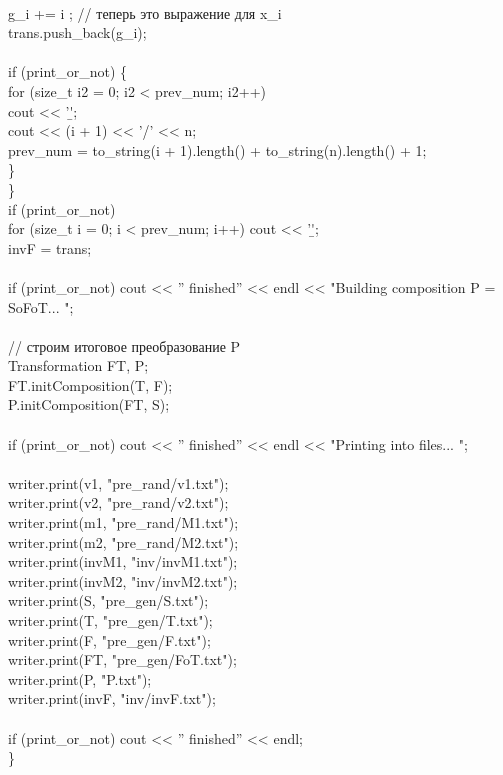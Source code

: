 		\\
		g\_i += { i }; // теперь это выражение для x\_i\\
		trans.push\_back(g\_i);\\
		\\
		if (print\_or\_not) \{\\
			for (size\_t i2 = 0; i2 < prev\_num; i2++)\\
			cout << '\b';\\
			cout << (i + 1) << '/' << n;\\
			prev\_num = to\_string(i + 1).length() + to\_string(n).length() + 1;\\
		\}\\
	\}\\
	if (print\_or\_not)\\
	for (size\_t i = 0; i < prev\_num; i++) cout << '\b';\\
	invF = trans;\\
	\\
	if (print\_or\_not) cout << '' finished'' << endl << "Building composition P = SoFoT... ";\\
	\\
	// строим итоговое преобразование P\\
	Transformation FT, P;\\
	FT.initComposition(T, F);\\
	P.initComposition(FT, S);\\
	\\
	if (print\_or\_not) cout << '' finished'' << endl << "Printing into files... ";\\
	\\
	writer.print(v1, "pre\_rand/v1.txt");\\
	writer.print(v2, "pre\_rand/v2.txt");\\
	writer.print(m1, "pre\_rand/M1.txt");\\
	writer.print(m2, "pre\_rand/M2.txt");\\
	writer.print(invM1, "inv/invM1.txt");\\
	writer.print(invM2, "inv/invM2.txt");\\
	writer.print(S, "pre\_gen/S.txt");\\
	writer.print(T, "pre\_gen/T.txt");\\
	writer.print(F, "pre\_gen/F.txt");\\
	writer.print(FT, "pre\_gen/FoT.txt");\\
	writer.print(P, "P.txt");\\
	writer.print(invF, "inv/invF.txt");\\
	\\
	if (print\_or\_not) cout << '' finished'' << endl;\\
\}\\


